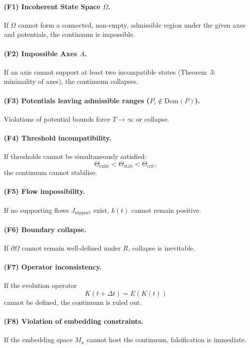 \paragraph{(F1) Incoherent State Space \texorpdfstring{$\Omega$}{\Omega}.}
If $\Omega$ cannot form a connected, non-empty, admissible region under
the given axes and potentials, the continuum is impossible.

\paragraph{(F2) Impossible Axes \texorpdfstring{$A$}{A}.}
If an axis cannot support at least two incompatible states
(Theorem~3: minimality of axes), the continuum collapses.

\paragraph{(F3) Potentials leaving admissible ranges ($P_i \notin \mathrm{Dom}(P)$).}
Violations of potential bounds force $T \to \infty$ or collapse.

\paragraph{(F4) Threshold incompatibility.}
If thresholds cannot be simultaneously satisfied:
\[
\Theta_{\mathrm{exist}} < \Theta_{\mathrm{stab}} < \Theta_{\mathrm{crit}},
\]
the continuum cannot stabilise.

\paragraph{(F5) Flow impossibility.}
If no supporting flows $J_{\mathrm{support}}$ exist, $k(t)$ cannot
remain positive.

\paragraph{(F6) Boundary collapse.}
If $\partial\Omega$ cannot remain well-defined under $R$,
collapse is inevitable.

\paragraph{(F7) Operator inconsistency.}
If the evolution operator
\[
K(t+\Delta t) = E(K(t))
\]
cannot be defined, the continuum is ruled out.

\paragraph{(F8) Violation of embedding constraints.}
If the embedding space $M_x$ cannot host the continuum, falsification
is immediate.



